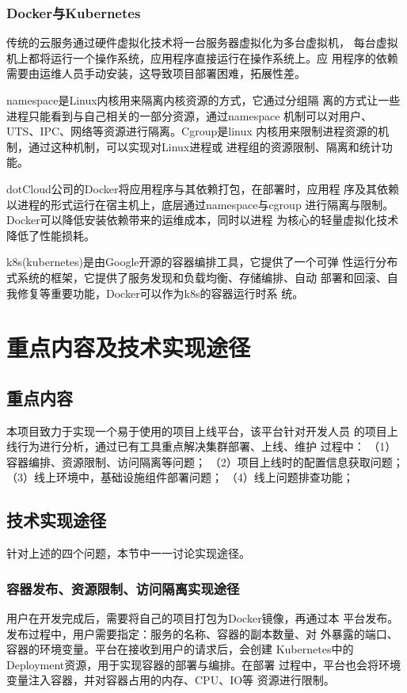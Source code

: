 \documentclass{article}
\begin{document}
\subsubsection{Docker与Kubernetes}
  传统的云服务通过硬件虚拟化技术将一台服务器虚拟化为多台虚拟机，
每台虚拟机上都将运行一个操作系统，应用程序直接运行在操作系统上。应
用程序的依赖需要由运维人员手动安装，这导致项目部署困难，拓展性差。

  namespace\cite{linuxNamespace}是Linux内核用来隔离内核资源的方式，它通过分组隔
离的方式让一些进程只能看到与自己相关的一部分资源，通过namespace
机制可以对用户、UTS、IPC、网络等资源进行隔离。Cgroup\cite{linuxCgroup}是linux
内核用来限制进程资源的机制，通过这种机制，可以实现对Linux进程或
进程组的资源限制、隔离和统计功能。
  
dotCloud公司的Docker将应用程序与其依赖打包，在部署时，应用程
序及其依赖以进程的形式运行在宿主机上，底层通过namespace与cgroup
进行隔离与限制。Docker可以降低安装依赖带来的运维成本，同时以进程
为核心的轻量虚拟化技术降低了性能损耗。
  
  k8s(kubernetes)是由Google开源的容器编排工具，它提供了一个可弹
性运行分布式系统的框架，它提供了服务发现和负载均衡、存储编排、自动
部署和回滚、自我修复等重要功能，Docker可以作为k8s的容器运行时系
统。

\section{重点内容及技术实现途径}

\subsection{重点内容}
  本项目致力于实现一个易于使用的项目上线平台，该平台针对开发人员
的项目上线行为进行分析，通过已有工具重点解决集群部署、上线、维护
过程中：
（1）容器编排、资源限制、访问隔离等问题；
（2）项目上线时的配置信息获取问题；
（3）线上环境中，基础设施组件部署问题；
（4）线上问题排查功能；
\subsection{技术实现途径}
  针对上述的四个问题，本节中一一讨论实现途径。

\subsubsection{容器发布、资源限制、访问隔离实现途径}
  用户在开发完成后，需要将自己的项目打包为Docker镜像，再通过本
平台发布。发布过程中，用户需要指定：服务的名称、容器的副本数量、对
外暴露的端口、容器的环境变量。平台在接收到用户的请求后，会创建
Kubernetes中的Deployment\cite{Deployments}资源，用于实现容器的部署与编排。在部署
过程中，平台也会将环境变量注入容器，并对容器占用的内存、CPU、IO等
资源进行限制。
\end{document}
